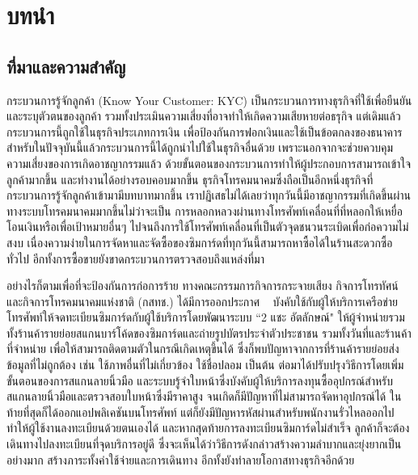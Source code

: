 \chapter{บทนำ}
\label{chapter:introduction}

\section{ที่มาและความสำคัญ}

กระบวนการรู้จักลูกค้า (Know Your Customer: KYC) เป็นกระบวนการทางธุรกิจที่ใช้เพื่อยืนยันและระบุตัวตนของลูกค้า รวมทั้งประเมินความเสี่ยงที่อาจทำให้เกิดความเสียหายต่อธรุกิจ แต่เดิมแล้ว กระบวนการนี้ถูกใช้ในธุรกิจประเภทการเงิน เพื่อป้องกันการฟอกเงินและใช้เป็นข้อตกลงของธนาคาร สำหรับในปัจจุบันนี้แล้วกระบวนการนี้ได้ถูกนำไปใช้ในธุรกิจอื่นด้วย เพราะนอกจากจะช่วยควบคุมความเสี่ยงของการเกิดอาชญากรรมแล้ว ด้วยขั้นตอนของกระบวนการทำให้ผู้ประกอบการสามารถเข้าใจลูกค้ามากขึ้น และทำงานได้อย่างรอบคอบมากขึ้น ธุรกิจโทรคมนาคมซึ่งถือเป็นอีกหนึ่งธุรกิจที่กระบวนการรู้จักลูกค้าเข้ามามีบทบาทมากขึ้น เราปฏิเสธไม่ได้เลยว่าทุกวันนี้มีอาชญากรรมที่เกิดขึ้นผ่านทางระบบโทรคมนาคมมากขึ้นไม่ว่าจะเป็น การหลอกหลวงผ่านทางโทรศัพท์เคลื่อนที่ที่หลอกให้เหยื่อโอนเงินหรือเพื่อเป้าหมายอื่นๆ ไปจนถึงการใช้โทรศัพท์เคลื่อนที่เป็นตัวจุดชนวนระเบิดเพื่อก่อความไม่สงบ เนื่องความง่ายในการจัดหาและจัดซื้อของซิมการ์ดที่ทุกวันนี้สามารถหาซื้อได้ในร้านสะดวกซื้อทั่วไป อีกทั้งการซื้อขายยังขาดกระบวนการตรวจสอบถึงแหล่งที่มา

อย่างไรก็ตามเพื่อที่จะป้องกันการก่อการร้าย ทางคณะกรรมการกิจการกระจายเสียง กิจการโทรทัศน์ และกิจการโทรคมนาคมแห่งชาติ (กสทช.) ได้มีการออกประกาศ ~\cite{NBTCAnnouncement} บังคับใช้กับผู้ให้บริการเครือข่ายโทรศัพท์ให้จดทะเบียนซิมการ์ดกับผู้ใช้บริการโดยพัฒนาระบบ ``2 แชะ อัตลักษณ์" ให้ผู้จำหน่ายรวมทั้งร้านค้ารายย่อยสแกนบาร์โค้ดของซิมการ์ดและถ่ายรูปบัตรประจำตัวประชาชน รวมทั้งวันที่และร้านค้าที่จำหน่าย เพื่อให้สามารถติดตามตัวในกรณีเกิดเหตุขึ้นได้ ซึ่งก็พบปัญหาจากการที่ร้านค้ารายย่อยส่งข้อมูลที่ไม่ถูกต้อง เช่น ใช้ภาพอื่นที่ไม่เกี่ยวข้อง ใช้ชื่อปลอม เป็นต้น ต่อมาได้ปรับปรุงวิธีการโดยเพิ่มขั้นตอนของการสแกนลายนิ้วมือ และระบบรู้จำใบหน้าซึ่งบังคับผู้ให้บริการลงทุนซื้ออุปกรณ์สำหรับสแกนลายนิ้วมือและตรวจสอบใบหน้าซึ่งมีราคาสูง จนเกิดก็มีปัญหาที่ไม่สามารถจัดหาอุปกรณ์ได้ ในท้ายที่สุดก็ได้ออกแอปพลิเคชันบนโทรศัพท์ แต่ก็ยังมีปัญหารหัสผ่านสำหรับพนักงานรั่วไหลออกไป ทำให้ผู้ใช้งานลงทะเบียนด้วยตนเองได้ และหากสุดท้ายการลงทะเบียนซิมการ์ดไม่สำเร็จ ลูกค้าก็จะต้องเดินทางไปลงทะเบียนที่จุดบริการอยู่ดี ซึ่งจะเห็นได้ว่าวิธีการดังกล่าวสร้างความลำบากและยุ่งยากเป็นอย่างมาก สร้างภาระทั้งค่าใช้จ่ายและการเดินทาง อีกทั้งยังทำลายโอกาสทางธุรกิจอีกด้วย

